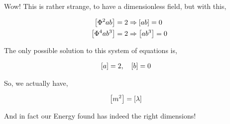 Wow! This is rather strange, to have a dimensionless field, but with this,

\begin{align}
    \qty[\Phi^2ab]&=2\Rightarrow \qty[ab]=0\nonumber\\
    \qty[\Phi^4ab^3]&=2\Rightarrow \qty[ab^3]=0\nonumber
\end{align}

The only possible solution to this system of equations is,

\begin{align}
    \qty[a]&=2,\ \ \ \qty[b]=0\nonumber
\end{align}

So, we actually have,

\begin{align}
    \qty[m^2]&=\qty[\lambda]\nonumber
\end{align}

And in fact our Energy found has indeed the right dimensions!